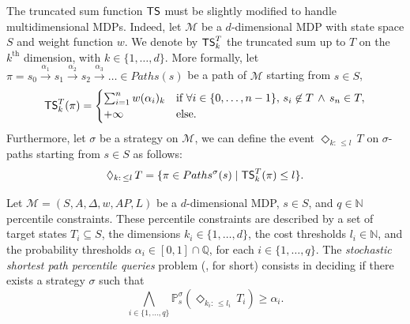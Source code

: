 \begin{remark}
  The truncated sum function $\text{\sffamily TS}$ must be slightly modified to handle multidimensional MDPs.
  Indeed, let $\mathcal{M}$ be a $d$-dimensional MDP with state space $S$ and weight function $w$.
  We denote by $\text{\sffamily TS}^T_{k}$ the truncated sum up to $T$ on the $k^\text{th}$ dimension, with $k \in \{1, \dots, d\}$.
  More formally, let $\pi = s_0 \xrightarrow{\alpha_1} s_1 \xrightarrow{\alpha_2} s_2 \xrightarrow{\alpha_3} \dots \in Paths(s)$ be a path of $\mathcal{M}$ starting from $s \in S$,
  \[
  \text{\sffamily TS}^T_k(\pi) = \begin{cases}
    \sum_{i=1}^{n} w(\alpha_i)_k & \text{if } \forall i \in \{0, \dots, n-1\}, \, s_{i} \not\in T \, \wedge \, s_n \in T, \\
    + \infty & \text{else}.
  \end{cases}
  \]
  Furthermore, let $\sigma$ be a strategy on $\mathcal{M}$, we can define the event $\Diamond_{k: \, \leq l} \, T$ on $\sigma$-paths  starting from $s \in S$ as follows:
  \[
    \Diamond_{k:\,\leq l}\,T=\{\pi \in Paths^\sigma(s) \; | \; \text{\sffamily TS}^T_k(\pi) \leq l \}.
  \]
\end{remark}

\begin{definition}
  Let $\mathcal{M}=(S, A, \Delta, w, AP, L)$ be a $d$-dimensional MDP, $s \in S$, and $q \in \mathbb{N}$ percentile constraints. These percentile constraints are described by a set of target states $T_i \subseteq S$, the dimensions $k_i \in \{1, \dots, d\}$, the cost thresholds $l_i \in \mathbb{N}$, and the probability thresholds $\alpha_i \in [0, 1] \cap \mathbb{Q}$, for each $i \in \{1, \dots, q\}$.
  The \textit{stochastic shortest path percentile queries} problem (\SSPPQ{}, for short) consists in deciding if there exists a strategy $\sigma$ such that
  \[
    \bigwedge_{i \in \{1, \dots, q \}} \mathbb{P}^\sigma_s(\Diamond_{k_i:\, \leq l_i}\, T_i) \geq \alpha_i.
  \]
\end{definition}

